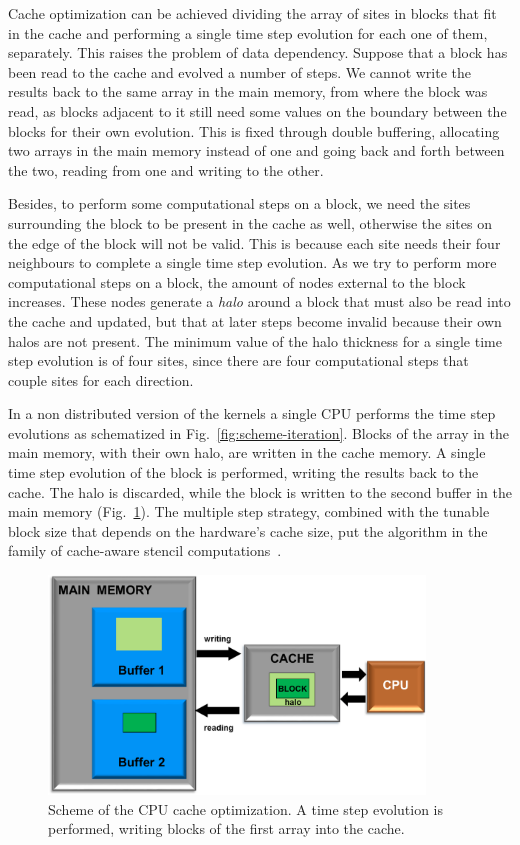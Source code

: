 Cache optimization can be achieved dividing the array of sites in blocks that fit in the cache and performing a single time step evolution for each one of them, separately. This raises the problem of data dependency. Suppose that a block has been read to the cache and evolved a number of steps. We cannot write the results back to the same array in the main memory, from where the block was read, as blocks adjacent to it still need some values on the boundary between the blocks for their own evolution. This is fixed through double buffering, allocating two arrays in the main memory instead of one and going back and forth between the two, reading from one and writing to the other.

Besides, to perform some computational steps on a block, we need the sites surrounding the block to be present in the cache as well, otherwise the sites on the edge of the block will not be valid. This is because each site needs their four neighbours to complete a single time step evolution. As we try to perform more computational steps on a block, the amount of nodes external to the block increases. These nodes generate a \textit{halo} around a block that must also be read into the cache and updated, but that at later steps become invalid because their own halos are not present. The minimum value of the halo thickness for a single time step evolution is of four sites, since there are four computational steps that couple sites for each direction.

In a non distributed version of the kernels a single CPU performs the time step evolutions as schematized in Fig.~\ref{fig:scheme-iteration}. Blocks of the array in the main memory, with their own halo, are written in the cache memory. A single time step evolution of the block is performed, writing the results back to the cache. The halo is discarded, while the block is written to the second buffer in the main memory (Fig.~\ref{fig:CPU-cache-optimization}). The multiple step strategy, combined with the tunable block size that depends on the hardware's cache size, put the algorithm in the family of cache-aware stencil computations~\cite{kamil2006implicit}.
\begin{figure}
   \centering
   \includegraphics[width=10cm]{Figs/CPU-cache_optimization.png}
   \caption{Scheme of the CPU cache optimization. A time step evolution is performed, writing blocks of the first array into the cache.} \label{fig:CPU-cache-optimization}
\end{figure}

